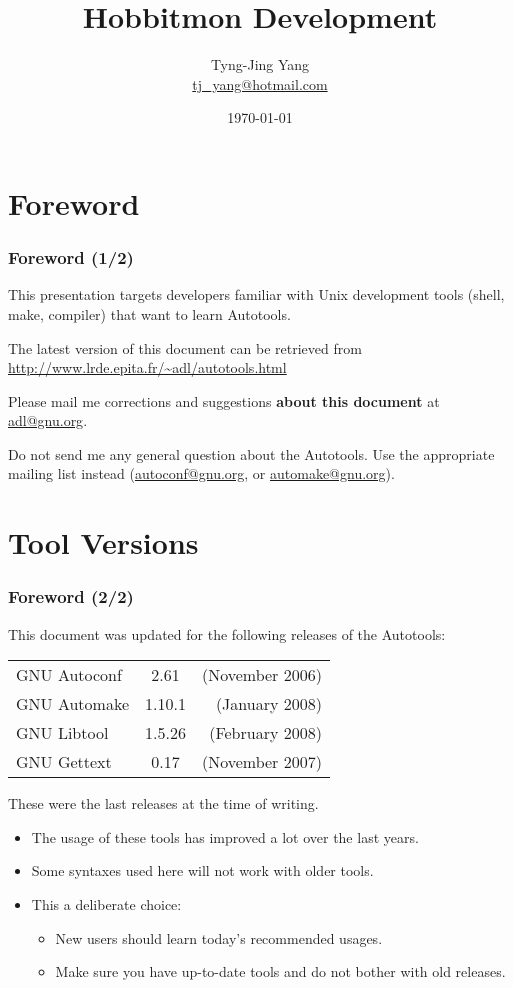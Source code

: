 \documentclass{beamer}
\title{Hobbitmon Development}
\author[T.J. Yang]{Tyng-Jing Yang \\\url{tj_yang@hotmail.com}}
\date{\today}
\begin{document}
\section*{Foreword}
\begin{frame}
\frametitle{Foreword (1/2)}

This presentation targets developers familiar with Unix development
tools (shell, make, compiler) that want to learn Autotools.

\bigskip

The latest version of this document can be retrieved from\\
{\small \url{http://www.lrde.epita.fr/~adl/autotools.html}}

\bigskip

Please mail me corrections and suggestions \textbf{about this
  document} at \url{adl@gnu.org}.

\medskip

Do not send me any general question about the Autotools.  Use the
appropriate mailing list instead (\url{autoconf@gnu.org}, or
\url{automake@gnu.org}).

\end{frame}

\section*{Tool Versions}
\begin{frame}
\frametitle{Foreword (2/2)}

This document was updated for the following releases of the
Autotools:

\gdef\gettextver{0.17}
\gdef\automakever{1.10.1}
\gdef\autoconfver{2.61}
\begin{center}
\begin{tabular}{lcr}
GNU Autoconf & \autoconfver & (November 2006) \\
GNU Automake & \automakever & (January 2008) \\
GNU Libtool  & 1.5.26       & (February 2008) \\
GNU Gettext  & \gettextver  & (November 2007) \\
\end{tabular}
\end{center}

These were the last releases at the time of writing.

\begin{itemize}
\item The usage of these tools has improved a lot over
  the last years.
\item Some syntaxes used here will not work with older tools.
\item This a deliberate choice:
\begin{itemize}
\item New users should learn today's recommended usages.
\item Make sure you have up-to-date tools and do not bother with old releases.
\end{itemize}
\end{itemize}

\end{frame}
\end{document}
